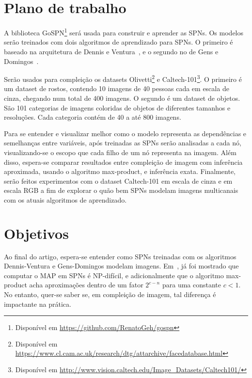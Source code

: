 \documentclass[12pt]{article}
\theoremstyle{plain}
\numberwithin{equation}{section}
\begin{document}
\section{Plano de trabalho}

A biblioteca GoSPN\footnote{Disponível em \url{https://github.com/RenatoGeh/gospn}} será usada para
construir e aprender as SPNs. Os modelos serão treinados com dois algoritmos de aprendizado para
SPNs. O primeiro é baseado na arquitetura de Dennis e Ventura~\cite{clustering}, e o segundo no de
Gens e Domingos~\cite{gens-domingos}.

Serão usados para compleição os datasets Olivetti\footnote{Disponível em
\url{https://www.cl.cam.ac.uk/research/dtg/attarchive/facedatabase.html}} e
Caltech-101\footnote{Disponível em \url{http://www.vision.caltech.edu/Image_Datasets/Caltech101/}}.
O primeiro é um dataset de rostos, contendo 10 imagens de 40 pessoas cada em escala de cinza,
chegando num total de 400 imagens. O segundo é um dataset de objetos. São 101 categorias de imagens
coloridas de objetos de diferentes tamanhos e resoluções. Cada categoria contém de 40 a até 800
imagens.

Para se entender e visualizar melhor como o modelo representa as dependências e semelhanças entre
variáveis, após treinadas as SPNs serão analisadas a cada nó, visualizando-se o escopo que cada
filho de um nó representa na imagem. Além disso, espera-se comparar resultados entre compleição de
imagem com inferência aproximada, usando o algoritmo max-product, e inferência exata. Finalmente,
serão feitos experimentos com o dataset Caltech-101 em escala de cinza e em escala RGB a fim de
explorar o quão bem SPNs modelam imagens multicanais com os atuais algoritmos de aprendizado.

\section{Objetivos}

Ao final do artigo, espera-se entender como SPNs treinadas com os algoritmos Dennis-Ventura e
Gens-Domingos modelam imagens. Em~\cite{cmc2017}, já foi mostrado que computar o MAP em SPNs é
NP-difícil, e adicionalmente que o algoritmo max-product acha aproximações dentro de um fator
$2^{c-n}$ para uma constante $c<1$. No entanto, quer-se saber se, em compleição de imagem, tal
diferença é impactante na prática.

\printbibliography[]
\end{document}
